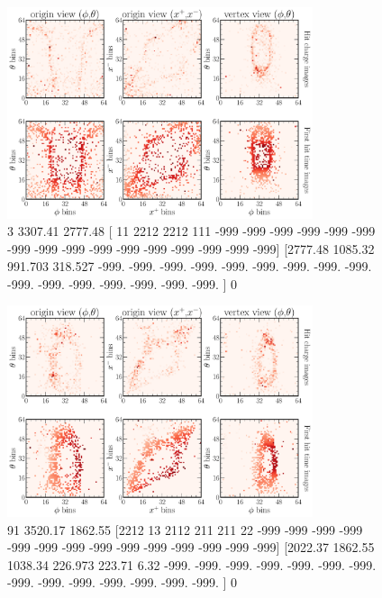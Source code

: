 \begin{figure} %
    \includegraphics[width=0.8\textwidth]{diagrams/7-cvn/chipsnet/explore_nuel_ccres_event.pdf}
    \caption[explore nuel ccres event short]
    {3
        3307.41
        2777.48
            [  11 2212 2212  111 -999 -999 -999 -999 -999 -999 -999 -999 -999 -999
                -999 -999 -999 -999 -999 -999]
            [2777.48  1085.32   991.703  318.527 -999.    -999.    -999.    -999.
                -999.    -999.    -999.    -999.    -999.    -999.    -999.    -999.
                -999.    -999.    -999.    -999.   ]
        0}
    \label{fig:explore_nuel_ccres_event}
\end{figure}

\begin{figure} %
    \includegraphics[width=0.8\textwidth]{diagrams/7-cvn/chipsnet/explore_numu_ccdis_event.pdf}
    \caption[explore numu ccdis event short]
    {91
        3520.17
        1862.55
            [2212   13 2112  211  211   22 -999 -999 -999 -999 -999 -999 -999 -999
                -999 -999 -999 -999 -999 -999]
            [2022.37  1862.55  1038.34   226.973  223.71     6.32  -999.    -999.
                -999.    -999.    -999.    -999.    -999.    -999.    -999.    -999.
                -999.    -999.    -999.    -999.   ]
        0}
    \label{fig:explore_numu_ccdis_event}
\end{figure}

